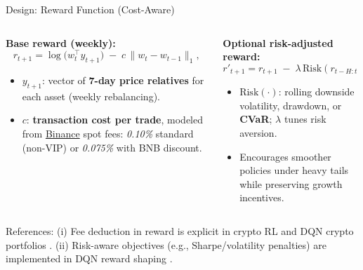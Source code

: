 \documentclass[aspectratio=169]{beamer}
\begin{document}
\begin{frame}{Design: Reward Function (Cost-Aware)}
\small
\begin{columns}[T,totalwidth=\textwidth]
\begin{column}{0.5\textwidth}
\textbf{Base reward (weekly):}
{\footnotesize
\[
  r_{t+1}=\log\!\big(w_t^\top y_{t+1}\big)\;-\;c\,\lVert w_t - w_{t-1}\rVert_1,
\]
}
\begin{itemize}\setlength{\itemsep}{3pt}
  \item $y_{t+1}$: vector of \textbf{7-day price relatives} for each asset (weekly rebalancing).
  \item $c$: \textbf{transaction cost per trade}, modeled from \href{https://www.binance.com/en/fee/schedule}{Binance} spot fees:
        \textit{0.10\%} standard (non-VIP) or \textit{0.075\%} with BNB discount.
\end{itemize}

\end{column}

\begin{column}{0.5\textwidth}
\textbf{Optional risk-adjusted reward:}
{\footnotesize
\[
  r'_{t+1} = r_{t+1} \;-\; \lambda\,\mathrm{Risk}(r_{t-H:t}),
\]
}
\begin{itemize}\setlength{\itemsep}{3pt}
  \item $\mathrm{Risk}(\cdot)$: rolling downside volatility, drawdown, or \textbf{CVaR}; $\lambda$ tunes risk aversion.
  \item Encourages smoother policies under heavy tails while preserving growth incentives.
\end{itemize}
\end{column}
\end{columns}

\vspace{0.35em}
{\footnotesize
References: (i) Fee deduction in reward is explicit in crypto RL \citep{jiang2017cryptocurrency,jiang2017framework,cui2023cvar} and DQN crypto portfolios \citep{lucarelli2020dqncrypto}. 
(ii) Risk-aware objectives (e.g., Sharpe/volatility penalties) are implemented in DQN reward shaping \citep{lucarelli2020dqncrypto}.
}

\end{frame}
\end{document}
